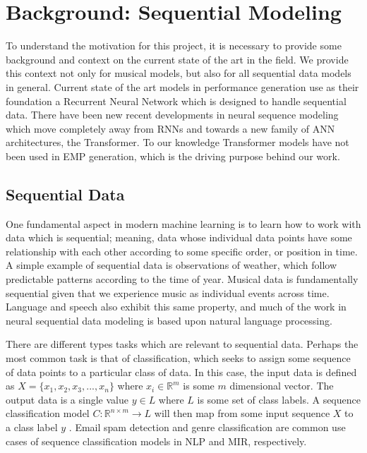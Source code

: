 \chapter{Background: Sequential Modeling}\label{ch:ch3}
To understand the motivation for this project, it is necessary to provide some background and context on the current state of the art in the field. We provide this context not only for musical models, but also for all sequential data models in general. Current state of the art models in performance generation use as their foundation a Recurrent Neural Network which is designed to handle sequential data. There have been new recent developments in neural sequence modeling which move completely away from RNNs and towards a new family of ANN architectures, the Transformer. To our knowledge Transformer models have not been used in EMP generation, which is the driving purpose behind our work. 

\section{Sequential Data}\label{sec:sequential-data}
One fundamental aspect in modern machine learning is to learn how to work with data which is sequential; meaning, data whose individual data points have some relationship with each other according to some specific order, or position in time. A simple example of sequential data is observations of weather, which follow predictable patterns according to the time of year. Musical data is fundamentally sequential\cite{widmer2016getting} given that we experience music as individual events across time. Language and speech also exhibit this same property, and much of the work in neural sequential data modeling is based upon natural language processing. 

There are different types tasks which are relevant to sequential data. Perhaps the most common task is that of classification, which seeks to assign some sequence of data points to a particular class of data. In this case, the input data is defined as $X = \{x_1, x_2, x_3, ..., x_n\}$ where $x_i \in \mathbb{R}^m$ is some $m$ dimensional vector. The output data is a single value $y \in L$ where $L$ is some set of class labels. A sequence classification model $C: \mathbb{R}^{n \times m} \rightarrow L$ will then map from some input sequence $X$ to a class label $y$ . Email spam detection and genre classification are common use cases of sequence classification models in NLP and MIR, respectively. 


